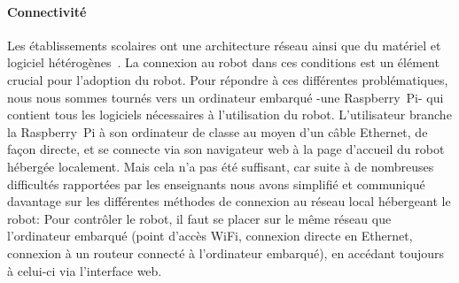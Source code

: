        \paragraph{Connectivité}
            Les établissements scolaires ont une architecture réseau ainsi que du matériel et logiciel hétérogènes~. La connexion au robot dans ces conditions est un élément crucial pour l'adoption du robot.
            Pour répondre à ces différentes problématiques, nous nous sommes tournés vers un ordinateur embarqué -une Raspberry~Pi- qui contient tous les logiciels nécessaires à l'utilisation du robot.
            L'utilisateur branche la Raspberry~Pi à son ordinateur de classe au moyen d'un câble Ethernet, de façon directe, et se connecte via son navigateur web à la page d'accueil du robot hébergée localement.
            Mais cela n'a pas été suffisant, car suite à de nombreuses difficultés rapportées par les enseignants nous avons simplifié et communiqué davantage sur les différentes méthodes de connexion au réseau local hébergeant le robot:
            Pour contrôler le robot, il faut se placer sur le même réseau que l’ordinateur embarqué (point d’accès WiFi, connexion directe en Ethernet, connexion à un routeur connecté à l’ordinateur embarqué), en accédant toujours à celui-ci via l'interface web.

